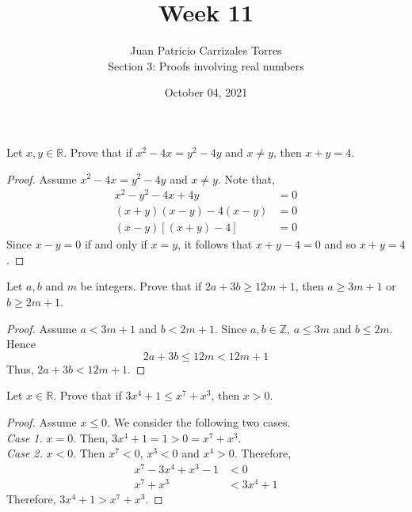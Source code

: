\documentclass[12pt]{article}
\newcommand{\Z}{\mathbb{Z}}
\newcommand{\R}{\mathbb{R}}
\newenvironment{problem}[2][Problem]{\begin{trivlist}
		\item[\hskip \labelsep {\bfseries #1}\hskip \labelsep {\bfseries #2.}]}{\end{trivlist}}
\begin{document}
	
	\title{Week 11}
	\author{Juan Patricio Carrizales Torres \\
		Section 3: Proofs involving real numbers}
	\date{October 04, 2021}
	\maketitle

	\begin{problem}{25}
		Let $x,y \in \R$. Prove that if $x^{2}-4x = y^{2} -4y$ and $x\neq y$, then $x+y=4$.
		\begin{proof}
			Assume $x^{2}-4x = y^{2} -4y$ and $x\neq y$. Note that,
			\begin{align*}
				x^{2}-y^{2}-4x+4y &= 0\\
				(x+y)(x-y)-4(x-y) &= 0\\
				(x-y)[(x+y)-4] &= 0
			\end{align*}
		Since $x-y=0$ if and only if $x=y$, it follows that $x+y -4 = 0$ and so $x+y=4$.
		\end{proof}
	\end{problem}

	\begin{problem}{26}
		Let $a,b$ and $m$ be integers. Prove that if $2a+3b\geq 12m+1$, then $a\geq 3m+1$ or $b\geq 2m+1$.
		\begin{proof}
			Assume $a<3m+1$ and $b<2m+1$. Since $a,b\in \Z$, $a\leq 3m$ and $b\leq 2m$. Hence
			\begin{equation*}
				2a+3b \leq 12m < 12m+1
			\end{equation*}
		Thus, $2a+3b < 12m+1$.
		\end{proof}
	\end{problem}

	\begin{problem}{27}
		Let $x\in \R$. Prove that if $3x^{4}+1 \leq x^{7} +x^{3}$, then $x>0$.
		\begin{proof}
			Assume $x\leq 0$. We consider the following two cases.\\
			\textit{Case 1.} $x=0$. Then, $3x^{4}+1 = 1 > 0 = x^{7} +x^{3}$.\\
			\textit{Case 2.} $x<0$. Then $x^{7} < 0$, $x^{3}<0$ and $x^{4} > 0$. Therefore,
			\begin{align*}
				x^{7} -3x^{4} +x^{3} -1 &< 0\\
				x^{7} +x^{3} &< 3x^{4} +1
			\end{align*}
			Therefore, $3x^{4} +1 > x^{7} +x^{3}$.
		\end{proof}
	\end{problem}
\end{document}
